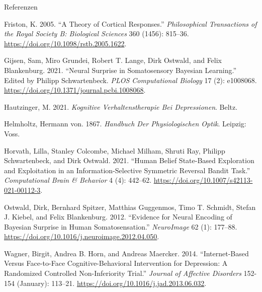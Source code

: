 \documentclass[
  8pt,
  ignorenonframetext,
]{beamer}
\newlength{\cslhangindent}
\newlength{\cslentryspacingunit} %
\newenvironment{CSLReferences}[2] %
 {%
  \setlength{\parindent}{0pt}
  \ifodd #1
  \let\oldpar\par
  \def\par{\hangindent=\cslhangindent\oldpar}
  \fi
  \setlength{\parskip}{#2\cslentryspacingunit}
 }%
 {}
\begin{document}
\begin{frame}{Referenzen}
\protect\hypertarget{referenzen}{}
\footnotesize

\hypertarget{refs}{}
\begin{CSLReferences}{1}{0}
\leavevmode{}%
Friston, K. 2005. {``A Theory of Cortical Responses.''}
\emph{Philosophical Transactions of the Royal Society B: Biological
Sciences} 360 (1456): 815--36.
\url{https://doi.org/10.1098/rstb.2005.1622}.

\leavevmode{}%
Gijsen, Sam, Miro Grundei, Robert T. Lange, Dirk Ostwald, and Felix
Blankenburg. 2021. {``Neural Surprise in Somatosensory {Bayesian}
Learning.''} Edited by Philipp Schwartenbeck. \emph{PLOS Computational
Biology} 17 (2): e1008068.
\url{https://doi.org/10.1371/journal.pcbi.1008068}.

\leavevmode{}%
Hautzinger, M. 2021. \emph{Kognitive {Verhaltenstherapie} Bei
{Depressionen}}. Beltz.

\leavevmode{}%
Helmholtz, Hermann von. 1867. \emph{Handbuch Der {Physiologischen}
{Optik}}. Leipzig: Voss.

\leavevmode{}%
Horvath, Lilla, Stanley Colcombe, Michael Milham, Shruti Ray, Philipp
Schwartenbeck, and Dirk Ostwald. 2021. {``Human {Belief} {State}-{Based}
{Exploration} and {Exploitation} in an {Information}-{Selective}
{Symmetric} {Reversal} {Bandit} {Task}.''} \emph{Computational Brain \&
Behavior} 4 (4): 442--62.
\url{https://doi.org/10.1007/s42113-021-00112-3}.

\leavevmode{}%
Ostwald, Dirk, Bernhard Spitzer, Matthias Guggenmos, Timo T. Schmidt,
Stefan J. Kiebel, and Felix Blankenburg. 2012. {``Evidence for Neural
Encoding of {Bayesian} Surprise in Human Somatosensation.''}
\emph{NeuroImage} 62 (1): 177--88.
\url{https://doi.org/10.1016/j.neuroimage.2012.04.050}.

\leavevmode{}%
Wagner, Birgit, Andrea B. Horn, and Andreas Maercker. 2014.
{``Internet-Based Versus Face-to-Face Cognitive-Behavioral Intervention
for Depression: {A} Randomized Controlled Non-Inferiority Trial.''}
\emph{Journal of Affective Disorders} 152-154 (January): 113--21.
\url{https://doi.org/10.1016/j.jad.2013.06.032}.

\end{CSLReferences}
\end{frame}
\end{document}
